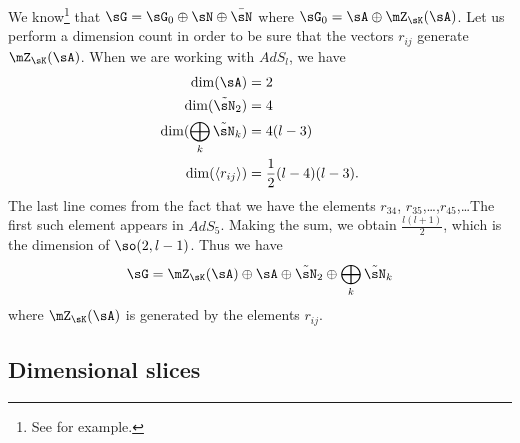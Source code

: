 We know\footnote{See \cite{Berndt} for example.} that $\sG=\sG_0\oplus\sN\oplus\bar\sN$ where $\sG_0=\sA\oplus\mZ_{\sK}(\sA)$. Let us perform a dimension count in order to be sure that the vectors $r_{ij}$ generate $\mZ_{\sK}(\sA)$. When we are working with $AdS_l$, we have
\begin{equation}
	\begin{aligned}[]
		\dim(\sA)&=2\\
		\dim(\tilde\sN_2)&=4\\
		\dim(\bigoplus_{k}\tilde\sN_k)&=4(l-3)\\
		\dim(\langle r_{ij}\rangle)&=\frac{ 1 }{2}(l-4)(l-3).
	\end{aligned}
\end{equation}
The last line comes from the fact that we have the elements $r_{34}$, $r_{35}$,\ldots,$r_{45}$,\ldots The first such element appears in $AdS_5$. Making the sum, we obtain $\frac{ l(l+1) }{ 2 }$, which is the dimension of $\so(2,l-1)$. Thus we have
\begin{equation}
	\sG=\mZ_{\sK}(\sA)\oplus\sA\oplus\tilde\sN_2\oplus\bigoplus_{k}\tilde\sN_k
\end{equation}
where $\mZ_{\sK}(\sA)$ is generated by the elements $r_{ij}$.
%

%
\subsection{Dimensional slices}
%
\label{LONGSubSecDimensionalSlices}

